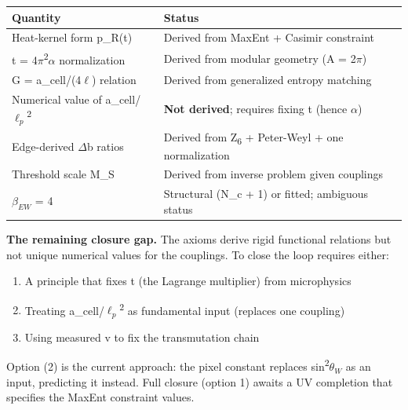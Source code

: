 \documentclass[11pt,a4paper]{article}
\theoremstyle{remark}
\providecommand{\tightlist}{%
  \setlength{\itemsep}{0pt}\setlength{\parskip}{0pt}}
\begin{document}
{\def\LTcaptype{none} %
\begin{longtable}[]{@{}
  >{\raggedright\arraybackslash}p{}
  >{\raggedright\arraybackslash}p{}@{}}
\toprule\noalign{}
\begin{minipage}[b]{\linewidth}\raggedright
Quantity
\end{minipage} & \begin{minipage}[b]{\linewidth}\raggedright
Status
\end{minipage} \\
\midrule\noalign{}
\endhead
\bottomrule\noalign{}
\endlastfoot
Heat-kernel form p\_R(t) & Derived from MaxEnt + Casimir constraint \\
t = 4\ensuremath{\pi}\textsuperscript{2}\ensuremath{\alpha} normalization & Derived from modular geometry (A = 2\ensuremath{\pi}) \\
G = a\_cell/(4\ensuremath{\ell}) relation & Derived from generalized entropy matching \\
Numerical value of a\_cell/$\ell_p$\textsuperscript{2} & \textbf{Not derived}; requires fixing t (hence \ensuremath{\alpha}) \\
Edge-derived \ensuremath{\Delta}b ratios & Derived from Z\textsubscript{6} + Peter-Weyl + one normalization \\
Threshold scale M\_S & Derived from inverse problem given couplings \\
$\beta_{EW}$ = 4 & Structural (N\_c + 1) or fitted; ambiguous status \\
\end{longtable}
}

\textbf{The remaining closure gap.} The axioms derive rigid functional relations but not unique numerical values for the couplings. To close the loop requires either:

\begin{enumerate}
\def\labelenumi{\arabic{enumi}.}
\tightlist
\item
  A principle that fixes t (the Lagrange multiplier) from microphysics
\item
  Treating a\_cell/$\ell_p$\textsuperscript{2} as fundamental input (replaces one coupling)
\item
  Using measured v to fix the transmutation chain
\end{enumerate}

Option (2) is the current approach: the pixel constant replaces sin\textsuperscript{2}$\theta_W$ as an input, predicting it instead. Full closure (option 1) awaits a UV completion that specifies the MaxEnt constraint values.
\end{document}
